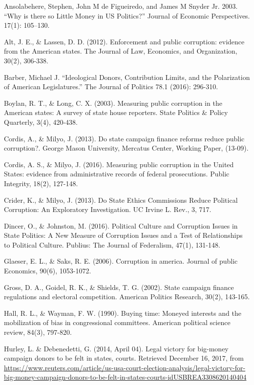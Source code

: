 \documentclass{jopsubmission}
\begin{document}
Ansolabehere, Stephen, John M de Figueiredo, and James M Snyder Jr.
2003. ``Why is there so Little Money in US Politics?'' Journal of
Economic Perspectives. 17(1): 105--130.

Alt, J. E., \& Lassen, D. D. (2012). Enforcement and public corruption:
evidence from the American states. The Journal of Law, Economics, and
Organization, 30(2), 306-338.

Barber, Michael J. ``Ideological Donors, Contribution Limits, and the
Polarization of American Legislatures.'' The Journal of Politics 78.1
(2016): 296-310.

Boylan, R. T., \& Long, C. X. (2003). Measuring public corruption in the
American states: A survey of state house reporters. State Politics \&
Policy Quarterly, 3(4), 420-438.

Cordis, A., \& Milyo, J. (2013). Do state campaign finance reforms
reduce public corruption?. George Mason University, Mercatus Center,
Working Paper, (13-09).

Cordis, A. S., \& Milyo, J. (2016). Measuring public corruption in the
United States: evidence from administrative records of federal
prosecutions. Public Integrity, 18(2), 127-148.

Crider, K., \& Milyo, J. (2013). Do State Ethics Commissions Reduce
Political Corruption: An Exploratory Investigation. UC Irvine L. Rev.,
3, 717.

Dincer, O., \& Johnston, M. (2016). Political Culture and Corruption
Issues in State Politics: A New Measure of Corruption Issues and a Test
of Relationships to Political Culture. Publius: The Journal of
Federalism, 47(1), 131-148.

Glaeser, E. L., \& Saks, R. E. (2006). Corruption in america. Journal of
public Economics, 90(6), 1053-1072.

Gross, D. A., Goidel, R. K., \& Shields, T. G. (2002). State campaign
finance regulations and electoral competition. American Politics
Research, 30(2), 143-165.

Hall, R. L., \& Wayman, F. W. (1990). Buying time: Moneyed interests and
the mobilization of bias in congressional committees. American political
science review, 84(3), 797-820.

Hurley, L. \& Debenedetti, G. (2014, April 04). Legal victory for
big-money campaign donors to be felt in states, courts. Retrieved
December 16, 2017, from
\url{https://www.reuters.com/article/us-usa-court-election-analysis/legal-victory-for-big-money-campaign-donors-to-be-felt-in-states-courts-idUSBREA3308620140404}
\end{document}
